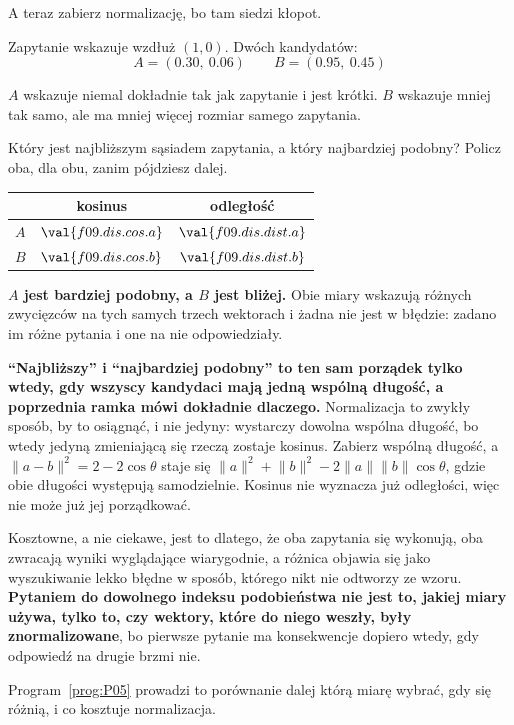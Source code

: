 \begin{fr}
A teraz zabierz normalizację, bo tam siedzi kłopot.

Zapytanie wskazuje wzdłuż $(1, 0)$. Dwóch kandydatów:
\[ A = (\num{0.30},\ \num{0.06}) \qquad B = (\num{0.95},\ \num{0.45}) \]

$A$ wskazuje niemal dokładnie tak jak zapytanie i jest krótki. $B$ wskazuje
mniej tak samo, ale ma mniej więcej rozmiar samego zapytania.

Który jest najbliższym sąsiadem zapytania, a który najbardziej podobny? Policz
oba, dla obu, zanim pójdziesz dalej.
\dotline
\nextframe
\end{fr}

\begin{fr}
\begin{ansblock}
\begin{center}
\begin{tabular}{lcc}
\toprule
& kosinus & odległość \\
\midrule
$A$ & $\val{f09.dis.cos.a}$ & $\val{f09.dis.dist.a}$ \\
$B$ & $\val{f09.dis.cos.b}$ & $\val{f09.dis.dist.b}$ \\
\bottomrule
\end{tabular}
\end{center}
\end{ansblock}

\textbf{$A$ jest bardziej podobny, a $B$ jest bliżej.} Obie miary wskazują
różnych zwycięzców na tych samych trzech wektorach i żadna nie jest w błędzie:
zadano im różne pytania i one na nie odpowiedziały.

\begin{trapbox}
\textbf{\enquote{Najbliższy} i \enquote{najbardziej podobny} to ten sam
porządek tylko wtedy, gdy wszyscy kandydaci mają jedną wspólną długość, a
poprzednia ramka mówi dokładnie dlaczego.} Normalizacja to zwykły sposób, by
to osiągnąć, i nie jedyny: wystarczy dowolna wspólna długość, bo wtedy jedyną
zmieniającą się rzeczą zostaje kosinus. Zabierz wspólną długość, a
$\lVert a - b \rVert^{2} = 2 - 2\cos\theta$
staje się $\lVert a \rVert^{2} + \lVert b \rVert^{2} - 2\lVert a \rVert
\lVert b \rVert \cos\theta$, gdzie obie długości występują samodzielnie.
Kosinus nie wyznacza już odległości, więc nie może już jej porządkować.

Kosztowne, a nie ciekawe, jest to dlatego, że oba zapytania się wykonują, oba
zwracają wyniki wyglądające wiarygodnie, a różnica objawia się jako
wyszukiwanie lekko błędne w sposób, którego nikt nie odtworzy ze wzoru.
\textbf{Pytaniem do dowolnego indeksu podobieństwa nie jest to, jakiej miary
używa, tylko to, czy wektory, które do niego weszły, były znormalizowane}, bo
pierwsze pytanie ma konsekwencje dopiero wtedy, gdy odpowiedź na drugie brzmi
nie.

Program~\ref{prog:P05} prowadzi to porównanie dalej \dash{} którą miarę wybrać,
gdy się różnią, i co kosztuje normalizacja.
\end{trapbox}
\end{fr}

